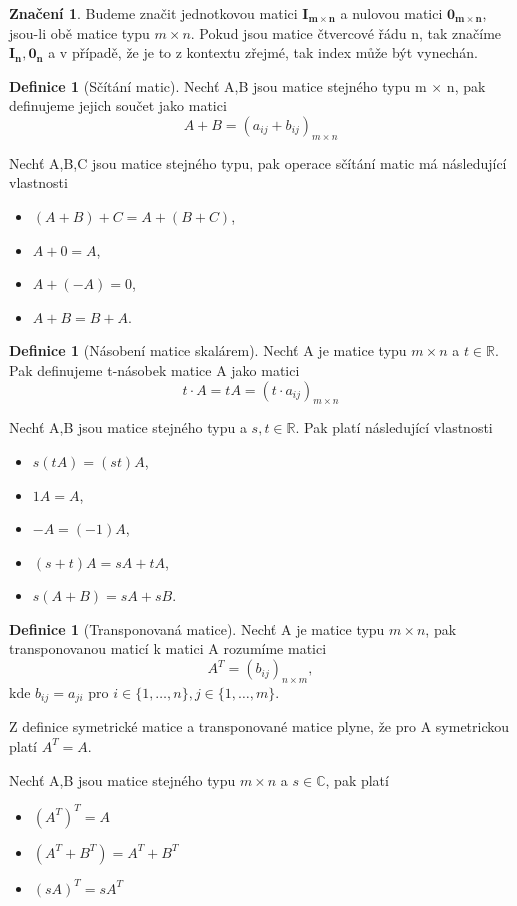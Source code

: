 \documentclass{article}
\theoremstyle{plain}
\theoremstyle{definition}
\newtheorem{definice}[veta]{Definice}
\newtheorem*{znaceni}{Značení}
\begin{document}
\begin{znaceni}
    Budeme značit jednotkovou matici $\mathbf{I_{m \times n}}$ a nulovou matici $\mathbf{0_{m \times n}}$, jsou-li obě matice typu $m\times n $. Pokud jsou matice čtvercové řádu n, tak značíme $\mathbf{I_n, 0_n}$ a v případě, že je to z kontextu zřejmé, tak index může být vynechán.
\end{znaceni}

\begin{definice}[Sčítání matic]
Nechť A,B jsou matice stejného typu m $\times$ n, pak definujeme jejich součet jako matici $$A+B=(a_{ij}+b_{ij})_{m \times n}$$
\end{definice}
Nechť A,B,C jsou matice stejného typu, pak operace sčítání matic má následující vlastnosti
\begin{itemize}
    \item $(A+B)+C=A+(B+C)$,
    \item  $A+0=A$,
    \item $A+(-A)=0$,
    \item $A+B=B+A$.
    
\end{itemize}
\newpage

\begin{definice}[Násobení matice skalárem]
Nechť A je matice typu $m \times n$ a $t \in \mathbb{R}$. Pak definujeme t-násobek matice A jako matici $$t\cdot A = tA = (t \cdot a_{ij})_{m \times n}$$
    
\end{definice}
Nechť A,B jsou matice stejného typu a $s,t \in \mathbb{R}$. Pak platí následující vlastnosti
\begin{itemize}
    \item $s(tA)=(st)A$,
    \item $1A=A$,
    \item $-A=(-1)A$,
    \item $(s+t)A=sA+tA$,
    \item $s(A+B)=sA+sB$.
\end{itemize}

\begin{definice}[Transponovaná matice]
Nechť A je matice typu $m \times n$, pak  transponovanou maticí k matici A rozumíme matici $$A^T=(b_{ij})_{n\times m},$$ kde $b_{ij}=a_{ji}$ pro $i \in \{1,\hdots,n\}, j\in \{1,\hdots,m\}$.
\end{definice}
Z definice symetrické matice a transponované matice plyne, že pro A symetrickou platí $A^T=A$.

Nechť A,B jsou matice stejného typu $m\times n$ a $s \in \mathbb{C}$, pak platí
\begin{itemize}
    \item $(A^T)^T=A$
    \item $(A^T+B^T)=A^T+B^T$
    \item $(sA)^T=sA^T$
\end{itemize}
\end{document}
